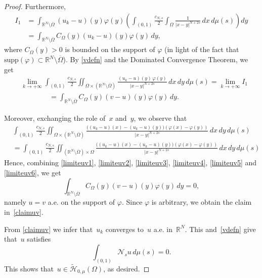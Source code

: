\documentclass[12pt,a4paper,intlimits,sumlimits]{amsart}
\def \R {\mathbb{R}}
\def \Ns {\mathscr{N}_{s}}
\theoremstyle{definition}
\theoremstyle{plain}
\numberwithin{equation}{section}
\begin{document}
\begin{proof}
Furthermore, 
\[
\begin{split}
I_1 &= \int_{\R^N\setminus \overline{\Omega}} (u_k-u)(y) \varphi(y) \left(  \int_{(0,1)}\frac{c_{N, s}}{2}\int_{\Omega} \frac{1}{|x-y|^{N+2s}} \, dx\, d\mu(s) \right) dy\\
&= \int_{\R^N\setminus \overline{\Omega}} C_\Omega (y) (u_k-u)(y) \varphi(y)\, dy,
\end{split}
\]
where $C_\Omega (y)>0$ is bounded on the support of $\varphi$ (in light of the fact that $\mbox{supp}(\varphi)\subset \R^N\setminus \overline{\Omega}$).
By \eqref{vdefn} and the Dominated Convergence Theorem, we get
\begin{equation}\label{limiteuv5}\begin{split}
&\lim_{k\to +\infty} \int_{(0,1)}\frac{c_{N, s}}{2}\iint_{\Omega\times(\R^N\setminus \overline{\Omega})}\frac{(u_k-u)(y)\,\varphi(y)}{|x-y|^{N+2s}}\,dx\,dy\,d\mu(s)=\lim_{k\to +\infty}I_1\\&\qquad\qquad= \int_{\R^N\setminus \overline{\Omega}} C_\Omega (y) (v-u)(y) \varphi(y)\, dy.
\end{split}\end{equation}

Moreover, exchanging the role of~$x$ and~$y$, we observe that
\begin{equation}\label{limiteuv6}
\begin{split}
&\int_{(0,1)}\frac{c_{N, s}}{2}\iint_{\Omega\times(\R^N\setminus \overline{\Omega})}\frac{\big( (u_k-u)(x)- (u_k-u)(y)\big)(\varphi(x)-\varphi(y))}{|x-y|^{N+2s}}\,dx\,dy\,d\mu(s)\\
&=\int_{(0,1)}\frac{c_{N, s}}{2}\iint_{(\R^N\setminus \overline{\Omega})\times\Omega}\frac{\big( (u_k-u)(x)- (u_k-u)(y)\big)(\varphi(x)-\varphi(y))}{|x-y|^{N+2s}}\,dx\,dy\,d\mu(s)
\end{split}
\end{equation}
Hence, combining \eqref{limiteuv1}, \eqref{limiteuv2}, \eqref{limiteuv3}, \eqref{limiteuv4}, \eqref{limiteuv5} and \eqref{limiteuv6}, we get
\[
\int_{\R^N\setminus \overline{\Omega}} C_\Omega (y) (v-u)(y) \varphi(y)\, dy = 0,
\]
namely $u=v$ a.e. on the support of $\varphi$. Since $\varphi$ is arbitrary, we obtain the claim in~\eqref{claimuv}.

{F}rom \eqref{claimuv} we infer that~$u_k$ converges to~$u$ a.e. in~$\R^N$. This and~\eqref{vdefn} give that~$u$ satisfies
\[
\int_{(0,1)}\Ns u\,d\mu(s)=0.
\]
This shows that~$u \in \widetilde{\mathcal H}_{0, \mu}(\Omega)$, as desired.
\end{proof}
\end{document}
